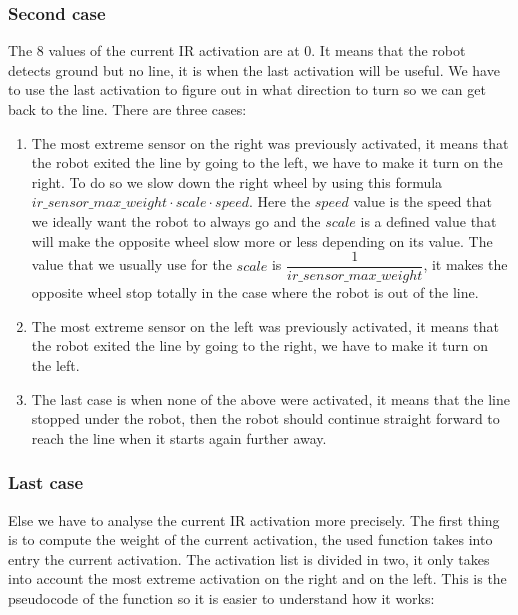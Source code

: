 \subsubsection*{Second case}

The 8 values of the current IR activation are at 0.
It means that the robot detects ground but no line, it is when the last activation will be useful.
We have to use the last activation to figure out in what direction to turn so we can get back to the line.
There are three cases:
\begin{enumerate}
    \item The most extreme sensor on the right was previously activated, it means that the robot exited the line by going to the left, we have to make it turn on the right.
        To do so we slow down the right wheel by using this formula $ir\_sensor\_max\_weight \cdot scale \cdot speed$.
        Here the $speed$ value is the speed that we ideally want the robot to always go and the $scale$ is a defined value that will make the opposite wheel slow more or less depending on its value.
        The value that we usually use for the $scale$ is $\dfrac{1}{ir\_sensor\_max\_weight}$, it makes the opposite wheel stop totally in the case where the robot is out of the line.
    \item The most extreme sensor on the left was previously activated, it means that the robot exited the line by going to the right, we have to make it turn on the left.
    \item The last case is when none of the above were activated, it means that the line stopped under the robot, then the robot should continue straight forward to reach the line when it starts again further away.
\end{enumerate}

\subsubsection*{Last case}

Else we have to analyse the current IR activation more precisely.
The first thing is to compute the weight of the current activation, the used function takes into entry the current activation.
The activation list is divided in two, it only takes into account the most extreme activation on the right and on the left.
This is the pseudocode of the function so it is easier to understand how it works:

